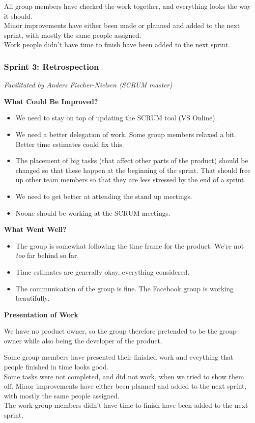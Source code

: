 {All group members have checked the work together, and everything looks the way it should.\\
Minor improvements have either been made or planned and added to the next sprint, with mostly the same people assigned.\\
Work people didn't have time to finish have been added to the next sprint.

\subsubsection{Sprint 3: Retrospection}
\label{sec:sprint3}
\small{\textit{Facilitated by Anders Fischer-Nielsen (SCRUM master)}} 

\textbf{What Could Be Improved?}

\begin{itemize}
	\item We need to stay on top of updating the SCRUM tool (VS Online).
	\item We need a better delegation of work. Some group members relaxed a bit. 
	\subitem Better time estimates could fix this.
	\item The placement of big tasks (that affect other parts of the product) should be changed so that these happen at the beginning of the sprint. That should free up other team members so that they are less stressed by the end of a sprint. 
	\item We need to get better at attending the stand up meetings.  
	\item Noone should be working at the SCRUM meetings. 
\end{itemize}

\textbf{What Went Well?}

\begin{itemize}
	\item The group is somewhat following the time frame for the product. We're not \textit{too} far behind so far.
	\item Time estimates are generally okay, everything considered. 
	\item The communication of the group is fine. The Facebook group is working beautifully. 
\end{itemize}

\textbf{Presentation of Work}

We have no product owner, so the group therefore pretended to be the group owner while also being the developer of the product.

Some group members have presented their finished work and eveything that people finished in time looks good.\\
Some tasks were not completed, and did not work, when we tried to show them off. 
Minor improvements have either been planned and added to the next sprint, with mostly the same people assigned.\\
The work group members didn't have time to finish have been added to the next sprint.\\

}
